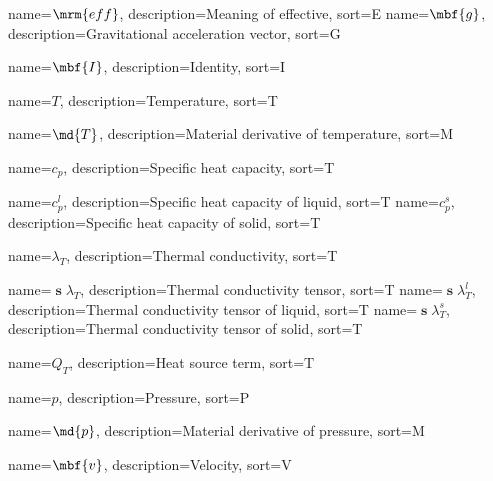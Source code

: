 \makeglossaries

\newcommand{\eff}{\mrm{eff}}
%
{%
  name={\ensuremath{\eff}},
  description={Meaning of effective},
  sort={E}
}
%
{%
  name={\ensuremath{\mbf{g}}},
  description={Gravitational acceleration vector},
  sort={G}
}

%
{%
  name={\ensuremath{\mbf{I}}},
  description={Identity},
  sort={I}
}



%
{%
  name={\ensuremath{T}},
  description={Temperature},
  sort={T}
}

%
{%
  name={\ensuremath{\md{T}}},
  description={Material derivative of temperature},
  sort={M}
}

\newcommand{\cp}{c_p}
%
{%
  name={\ensuremath{\cp}},
  description={Specific heat capacity},
  sort={T}
}

%
{%
  name={\ensuremath{\cp^l}},
  description={Specific heat capacity of liquid},
  sort={T}
}
%
{%
  name={\ensuremath{\cp^s}},
  description={Specific heat capacity of solid},
  sort={T}
}

\newcommand{\Tconduct}{\mbfs{\lambda}_T}
%
{%
  name={\ensuremath{\lambda_T}},
  description={Thermal conductivity},
  sort={T}
}

%
{%
  name={\ensuremath{\Tconduct}},
  description={Thermal conductivity tensor},
  sort={T}
}
%
{%
  name={\ensuremath{\Tconduct^l}},
  description={Thermal conductivity tensor of liquid},
  sort={T}
}
%
{%
  name={\ensuremath{\Tconduct^s}},
  description={Thermal conductivity tensor of solid},
  sort={T}
}

%
{%
  name={\ensuremath{Q_T}},
  description={Heat source term},
  sort={T}
}

%
{%
  name={\ensuremath{p}},
  description={Pressure},
  sort={P}
}

%
{%
  name={\ensuremath{\md{p}}},
  description={Material derivative of pressure},
  sort={M}
}

\newcommand{\vel}{\mbf{v}}
%
{%
  name={\ensuremath{\vel}},
  description={Velocity},
  sort={V}
}

